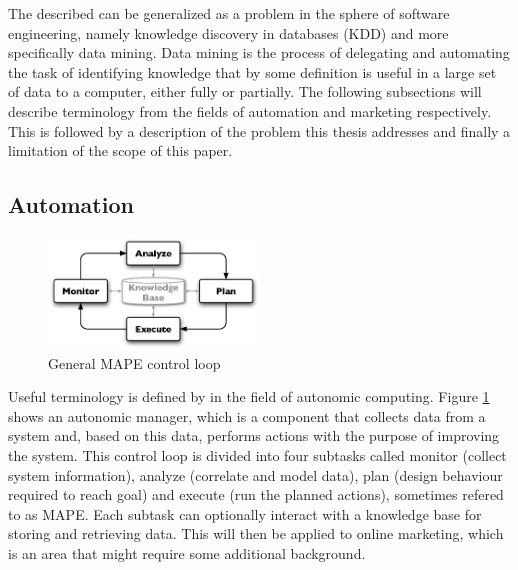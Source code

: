 \documentclass[10pt,twocolumn]{article}
\begin{document}
The described can be generalized as a problem in the sphere of software engineering, namely knowledge discovery in databases (KDD) and more specifically data mining. Data mining is the process of delegating and automating the task of identifying knowledge that by some definition is useful in a large set of data to a computer, either fully or partially. The following subsections will describe terminology from the fields of automation and marketing respectively. This is followed by a description of the problem this thesis addresses and finally a limitation of the scope of this paper.

\subsection{Automation}
\begin{figure}[htb] \centering \includegraphics[width=0.5\textwidth]{mape.eps}
	\caption{General MAPE control loop}
	\label{fig:MAPE}
\end{figure}

Useful terminology is defined by \citet{IBM2006} in the field of autonomic computing. Figure \ref{fig:MAPE} shows an autonomic manager, which is a component that collects data from a system and, based on this data, performs actions with the purpose of improving the system. This control loop is divided into four subtasks called monitor (collect system information), analyze (correlate and model data), plan (design behaviour required to reach goal) and execute (run the planned actions), sometimes refered to as MAPE. Each subtask can optionally interact with a knowledge base for storing and retrieving data. This will then be applied to online marketing, which is an area that might require some additional background.
\end{document}
